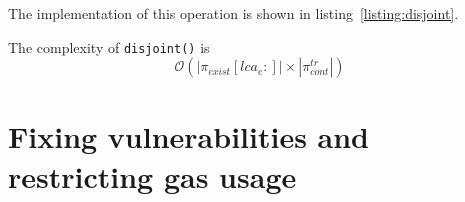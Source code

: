 The implementation of this operation is shown in
listing~\ref{listing:disjoint}.



The complexity of \texttt{disjoint()} is
\[ \mathcal{O}(|\pi_{exist}[lca_{e}:]| \times
|\pi_{cont}^{tr}|) \]

\section{Fixing vulnerabilities and restricting gas usage}

%
%

